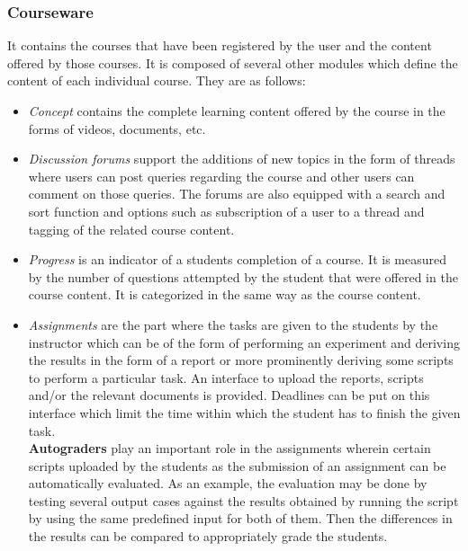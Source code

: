 \subsubsection*{Courseware}
It contains the courses that have been registered by the user and the content offered by those courses. It is composed of several other modules which define the content of each individual course. They are as follows:
\begin{itemize}
	\item \emph{Concept} contains the complete learning content offered by the course in the forms of videos, documents, etc.
	\item \emph{Discussion forums} support the additions of new topics in the form of threads where users can post queries regarding the course and other users can comment on those queries. The forums are also equipped with a search and sort function and options such as subscription of a user to a thread and tagging of the related course content.
	\item \emph{Progress} is an indicator of a students completion of a course. It is measured by the number of questions attempted by the student that were offered in the course content. It is categorized in the same way as the course content.
	\item \emph{Assignments} are the part where the tasks are given to the students by the instructor which can be of the form of performing an experiment and deriving the results in the form of a report or more prominently deriving some scripts to perform a particular task. An interface to upload the reports, scripts and/or the relevant documents is provided. Deadlines can be put on this interface which limit the time within which the student has to finish the given task.\\
	\textbf{Autograders} play an important role in the assignments wherein certain scripts uploaded by the students as the submission of an assignment can be automatically evaluated. As an example, the evaluation may be done by testing several output cases against the results obtained by running the script by using the same predefined input for both of them. Then the differences in the results can be compared to appropriately grade the students.
\end{itemize}

